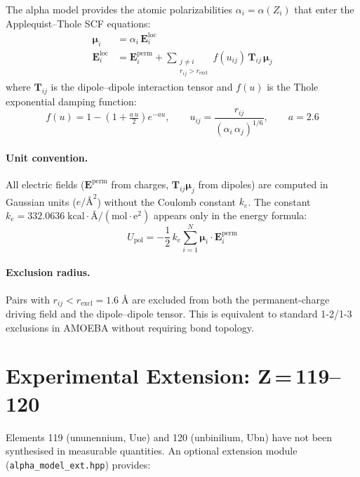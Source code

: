 \documentclass[11pt,letterpaper]{article}
\newcommand{\Ang}{\text{\AA}}
\begin{document}
The alpha model provides the atomic polarizabilities
$\alpha_i = \alpha(Z_i)$ that enter the Applequist--Thole SCF equations:
\begin{align}
\bm\mu_i &= \alpha_i \, \mathbf{E}_i^{\mathrm{loc}} \label{eq:scf1} \\
\mathbf{E}_i^{\mathrm{loc}} &= \mathbf{E}_i^{\mathrm{perm}}
  + \sum_{\substack{j \ne i \\ r_{ij} > r_{\mathrm{excl}}}}
  f(u_{ij})\,\mathbf{T}_{ij}\,\bm\mu_j \label{eq:scf2}
\end{align}
where $\mathbf{T}_{ij}$ is the dipole--dipole interaction tensor and
$f(u)$ is the Thole exponential damping function:
\begin{equation}
f(u) = 1 - \left(1 + \tfrac{a\,u}{2}\right)e^{-au}, \qquad
u_{ij} = \frac{r_{ij}}{(\alpha_i\,\alpha_j)^{1/6}}, \qquad
a = 2.6
\label{eq:thole}
\end{equation}

\paragraph{Unit convention.}
All electric fields ($\mathbf{E}^{\mathrm{perm}}$ from charges,
$\mathbf{T}_{ij}\bm\mu_j$ from dipoles) are computed in Gaussian units
($e/\Ang^2$) without the Coulomb constant $k_e$.  The constant
$k_e = 332.0636\;\mathrm{kcal\cdot\Ang/(mol\cdot e^2)}$ appears only in
the energy formula:
\begin{equation}
U_{\mathrm{pol}} = -\frac{1}{2}\,k_e \sum_{i=1}^{N}
  \bm\mu_i \cdot \mathbf{E}_i^{\mathrm{perm}}
\label{eq:upol}
\end{equation}

\paragraph{Exclusion radius.}
Pairs with $r_{ij} < r_{\mathrm{excl}} = 1.6\;\Ang$ are excluded from
both the permanent-charge driving field and the dipole--dipole tensor.
This is equivalent to standard 1-2/1-3 exclusions in AMOEBA without
requiring bond topology.

\section{Experimental Extension: Z\,=\,119--120}
\label{sec:ext}

Elements 119 (ununennium, Uue) and 120 (unbinilium, Ubn) have not been
synthesised in measurable quantities.  An optional extension module
(\texttt{alpha\_model\_ext.hpp}) provides:
\end{document}
